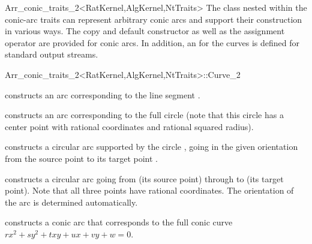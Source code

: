 \begin{ccRefClass}{Arr_conic_traits_2<RatKernel,AlgKernel,NtTraits>}
The  class nested within the conic-arc traits can represent
arbitrary conic arcs and support their construction in various ways.
The copy and default constructor as well as the assignment operator are
provided for conic arcs. In addition, an 
for the curves is defined for standard output streams.

\begin{ccClass}{Arr_conic_traits_2<RatKernel,AlgKernel,NtTraits>::Curve_2}

\ccCreation
{}

    {constructs an arc corresponding to the line segment .}

    {constructs an arc corresponding to the full circle 
     (note that this circle has a center point with rational coordinates
     and rational squared radius).}

    {constructs a circular arc supported by the circle , going
     in the given orientation  from the source point  to
     its target point .
     }

    {constructs a circular arc going from  (its source point)
     through  to  (its target point). Note that all three
     points have rational coordinates. The orientation of the arc is
     determined automatically.
     }

    {constructs a conic arc that corresponds to the full conic curve
     $r x^2 + s y^2 + t x y + u x + v y + w = 0$.
     }


\end{ccClass}
\end{ccRefClass}
